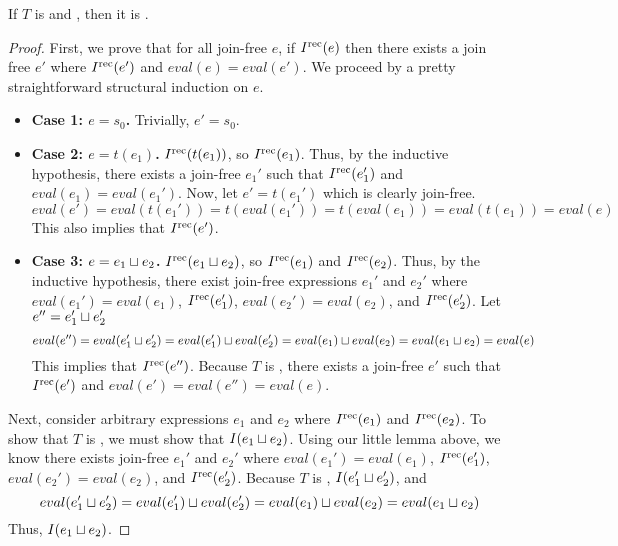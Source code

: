 \begin{claim}
  If $T$ is \dIconfluent{} and \dIreducible, then it is \Iconfluent.
\end{claim}
\begin{proof}
  First, we prove that for all join-free $e$, if $I^{\text{rec}}(e)$ then there exists a
  join free $e'$ where $I^{\text{rec}}(e')$ and $eval(e) = eval(e')$. We proceed by a
  pretty straightforward structural induction on $e$.
  \begin{itemize}
    \item \textbf{Case 1: $e = s_0$.}
      Trivially, $e' = s_0.$

    \item \textbf{Case 2: $e = t(e_1)$.}
      $I^{\text{rec}}(t(e_1))$, so $I^{\text{rec}}(e_1)$. Thus, by the inductive hypothesis,
      there exists a join-free $e_1'$ such that $I^{\text{rec}}(e_1')$ and $eval(e_1) =
      eval(e_1')$. Now, let $e' = t(e_1')$ which is clearly join-free.
      \[
        eval(e')
          = eval(t(e_1'))
          = t(eval(e_1'))
          = t(eval(e_1))
          = eval(t(e_1))
          = eval(e)
      \]
      This also implies that $I^{\text{rec}}(e')$.

    \item \textbf{Case 3: $e = e_1 \sqcup e_2$.}
      $I^{\text{rec}}(e_1 \sqcup e_2)$, so $I^{\text{rec}}(e_1)$ and $I^{\text{rec}}(e_2)$. Thus, by the
      inductive hypothesis, there exist join-free expressions $e_1'$ and $e_2'$
      where $eval(e_1') = eval(e_1)$, $I^{\text{rec}}(e_1')$, $eval(e_2') = eval(e_2)$,
      and $I^{\text{rec}}(e_2')$. Let $e'' = e_1' \sqcup e_2'$
      \[
        eval(e'')
          = eval(e_1' \sqcup e_2')
          = eval(e_1') \sqcup eval(e_2')
          = eval(e_1) \sqcup eval(e_2)
          = eval(e_1 \sqcup e_2)
          = eval(e)
      \]
      This implies that $I^{\text{rec}}(e'')$. Because $T$ is \dIreducible, there exists
      a join-free $e'$ such that $I^{\text{rec}}(e')$ and $eval(e') = eval(e'') =
      eval(e)$.
  \end{itemize}

  Next, consider arbitrary expressions $e_1$ and $e_2$ where $I^{\text{rec}}(e_1)$ and
  $I^{\text{rec}}(e_2)$. To show that $T$ is \Iconfluent, we must show that $I(e_1 \sqcup
  e_2)$. Using our little lemma above, we know there exists join-free $e_1'$
  and $e_2'$ where $eval(e_1') = eval(e_1)$, $I^{\text{rec}}(e_1')$, $eval(e_2') =
  eval(e_2)$, and $I^{\text{rec}}(e_2')$. Because $T$ is \dIconfluent, $I(e_1' \sqcup e_2')$, and
  \[
    eval(e_1' \sqcup e_2')
      = eval(e_1') \sqcup eval(e_2')
      = eval(e_1) \sqcup eval(e_2)
      = eval(e_1 \sqcup e_2)
  \]
  Thus, $I(e_1 \sqcup e_2)$.
\end{proof}
